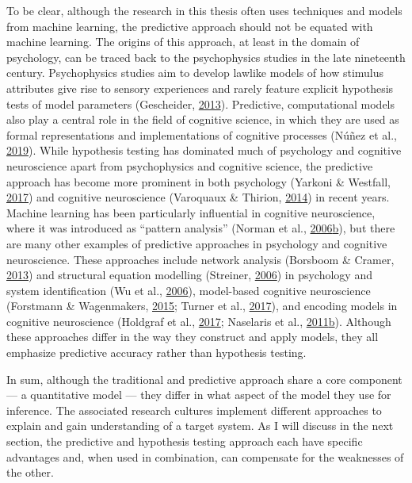 \documentclass[11pt,american,a4paper,oneside,]{memoir} %
\begin{document}
To be clear, although the research in this thesis often uses techniques and models from machine learning, the predictive approach should not be equated with machine learning. The origins of this approach, at least in the domain of psychology, can be traced back to the psychophysics studies in the late nineteenth century. Psychophysics studies aim to develop lawlike models of how stimulus attributes give rise to sensory experiences and rarely feature explicit hypothesis tests of model parameters (Gescheider, \protect\hyperlink{ref-Gescheider2013-zm}{2013}). Predictive, computational models also play a central role in the field of cognitive science, in which they are used as formal representations and implementations of cognitive processes (Núñez et al., \protect\hyperlink{ref-Nunez2019-lh}{2019}). While hypothesis testing has dominated much of psychology and cognitive neuroscience apart from psychophysics and cognitive science, the predictive approach has become more prominent in both psychology (Yarkoni \& Westfall, \protect\hyperlink{ref-Yarkoni2017-om}{2017}) and cognitive neuroscience (Varoquaux \& Thirion, \protect\hyperlink{ref-Varoquaux2014-su}{2014}) in recent years. Machine learning has been particularly influential in cognitive neuroscience, where it was introduced as ``pattern analysis'' (Norman et al., \protect\hyperlink{ref-Norman2006-bt}{2006}\protect\hyperlink{ref-Norman2006-bt}{b}), but there are many other examples of predictive approaches in psychology and cognitive neuroscience. These approaches include network analysis (Borsboom \& Cramer, \protect\hyperlink{ref-Borsboom2013-wb}{2013}) and structural equation modelling (Streiner, \protect\hyperlink{ref-Streiner2006-ze}{2006}) in psychology and system identification (Wu et al., \protect\hyperlink{ref-Wu2006-qs}{2006}), model-based cognitive neuroscience (Forstmann \& Wagenmakers, \protect\hyperlink{ref-Forstmann2015-rz}{2015}; Turner et al., \protect\hyperlink{ref-Turner2017-fi}{2017}), and encoding models in cognitive neuroscience (Holdgraf et al., \protect\hyperlink{ref-Holdgraf2017-eu}{2017}; Naselaris et al., \protect\hyperlink{ref-Naselaris2011-oh}{2011}\protect\hyperlink{ref-Naselaris2011-oh}{b}). Although these approaches differ in the way they construct and apply models, they all emphasize predictive accuracy rather than hypothesis testing.

In sum, although the traditional and predictive approach share a core component --- a quantitative model --- they differ in what aspect of the model they use for inference. The associated research cultures implement different approaches to explain and gain understanding of a target system. As I will discuss in the next section, the predictive and hypothesis testing approach each have specific advantages and, when used in combination, can compensate for the weaknesses of the other.
\end{document}
